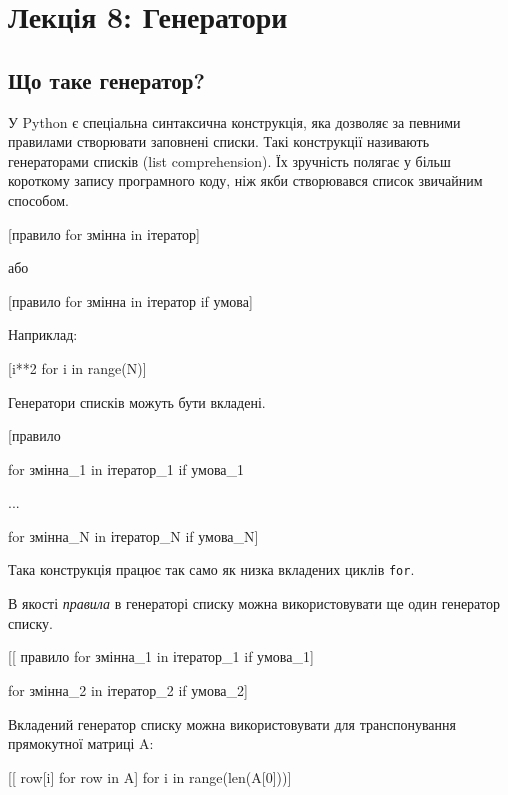 \section{Лекція 8: Генератори}
 
 \subsection{Що таке генератор?} 
\begin{frame}
У Python є спеціальна синтаксична конструкція, яка дозволяє за певними правилами створювати заповнені списки. Такі конструкції називають генераторами списків (list comprehension). Їх зручність полягає у більш короткому запису програмного коду, ніж якби створювався список звичайним способом.

\LARGE{[правило for змінна in ітератор]}

\normalsize або

\LARGE{[правило for змінна in ітератор if умова]}

\normalsize Наприклад:

[i**2 for i in range(N)]

\end{frame}

\begin{frame}
Генератори списків можуть бути вкладені.

\LARGE{[правило

 for змінна\_1 in ітератор\_1 if умова\_1
 
 ...
 
 for змінна\_N in ітератор\_N if умова\_N]}

\normalsize Така конструкція працює так само як низка вкладених циклів \texttt{for}.

\end{frame}

\begin{frame}
В якості \textit{правила} в генераторі списку можна використовувати ще один генератор списку.

\Large{[[ правило for змінна\_1 in ітератор\_1 if умова\_1]

 for змінна\_2 in ітератор\_2 if умова\_2]}

\end{frame}

\begin{frame}
Вкладений генератор списку можна використовувати для транспонування прямокутної матриці A:

\vspace{1cm}

\large{[[ row[i] for row in A] for i in range(len(A[0]))]}

\end{frame}

